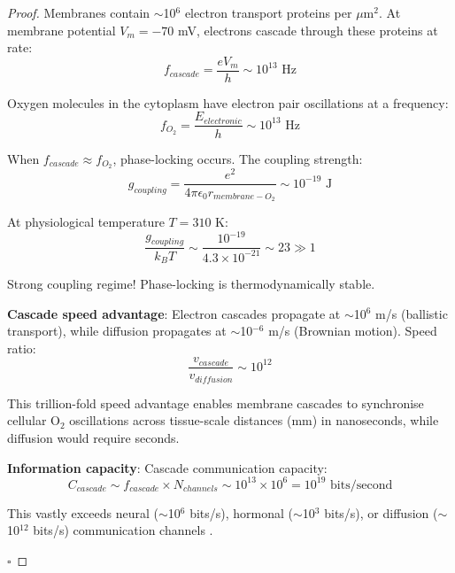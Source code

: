 \documentclass[11pt,a4paper]{article}
\begin{document}
\begin{proof}
Membranes contain $\sim$10$^6$ electron transport proteins per $\mu$m$^2$. At membrane potential $V_m = -70$ mV, electrons cascade through these proteins at rate:
\begin{equation}
f_{cascade} = \frac{e V_m}{h} \sim 10^{13} \text{ Hz}
\end{equation}

Oxygen molecules in the cytoplasm have electron pair oscillations at a frequency:
\begin{equation}
f_{O_2} = \frac{E_{electronic}}{h} \sim 10^{13} \text{ Hz}
\end{equation}

When $f_{cascade} \approx f_{O_2}$, phase-locking occurs. The coupling strength:
\begin{equation}
g_{coupling} = \frac{e^2}{4\pi\epsilon_0 r_{membrane-O_2}} \sim 10^{-19} \text{ J}
\end{equation}

At physiological temperature $T = 310$ K:
\begin{equation}
\frac{g_{coupling}}{k_B T} \sim \frac{10^{-19}}{4.3 \times 10^{-21}} \sim 23 \gg 1
\end{equation}

Strong coupling regime! Phase-locking is thermodynamically stable.

\textbf{Cascade speed advantage}: Electron cascades propagate at $\sim$10$^6$ m/s (ballistic transport), while diffusion propagates at $\sim$10$^{-6}$ m/s (Brownian motion). Speed ratio:
\begin{equation}
\frac{v_{cascade}}{v_{diffusion}} \sim 10^{12}
\end{equation}

This trillion-fold speed advantage enables membrane cascades to synchronise cellular O$_2$ oscillations across tissue-scale distances (mm) in nanoseconds, while diffusion would require seconds.

\textbf{Information capacity}: Cascade communication capacity:
\begin{equation}
C_{cascade} \sim f_{cascade} \times N_{channels} \sim 10^{13} \times 10^6 = 10^{19} \text{ bits/second}
\end{equation}

This vastly exceeds neural ($\sim$10$^6$ bits/s), hormonal ($\sim$10$^3$ bits/s), or diffusion ($\sim$10$^{12}$ bits/s) communication channels \cite{sachikonye2024biological}.

$\square$
\end{proof}
\end{document}
